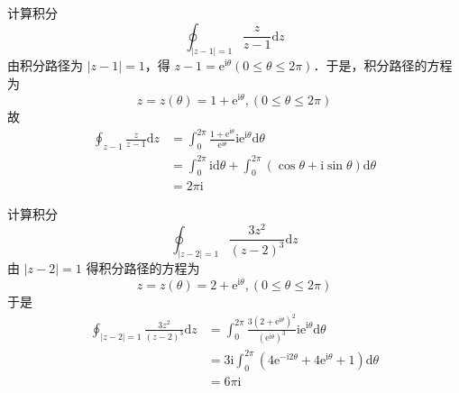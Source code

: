 \begin{example}{}
计算积分
\begin{equation}
\oint_{|z-1|=1} \frac{z}{z-1} \mathrm{d} z
\end{equation}
由积分路径为 $|z -1|=1$，得 $z-1=\mathrm{e}^{\mathrm{i} \theta}(0 \leqslant \theta \leqslant 2 \pi)$．于是，积分路径的方程为
\begin{equation}
z=z(\theta)=1+\mathrm{e}^{\mathrm{i} \theta},(0 \leqslant \theta \leqslant 2 \pi)
\end{equation}
故
\begin{equation}
\begin{aligned} \oint_{z-1} \frac{z}{z-1} \mathrm{d} z &=\int_{0}^{2 \pi} \frac{1+\mathrm{e}^{\mathrm{i} \theta}}{\mathrm{e}^{\mathrm{i} \theta}} \mathrm{ie}^{\mathrm{i} \theta} \mathrm{d} \theta \\ &=\int_{0}^{2 \pi} \mathrm{id} \theta+\int_{0}^{2 \pi}(\cos \theta+\mathrm{i} \sin \theta) \mathrm{d} \theta \\ &=2 \pi \mathrm{i} \end{aligned}
\end{equation}
\end{example}

\begin{example}{}
计算积分
\begin{equation}
\oint_{|z-2|=1} \frac{3 z^{2}}{(z-2)^{3}} \mathrm{d} z
\end{equation}
由 $ |z - 2| =1$ 得积分路径的方程为
\begin{equation}
z=z(\theta)=2+\mathrm{e}^{\mathrm{i} \theta},(0 \leqslant \theta \leqslant 2 \pi)
\end{equation}
于是
\begin{equation}
\begin{aligned} \oint_{|z-2|=1} \frac{3 z^{2}}{(z-2)^{3}} \mathrm{d} z &=\int_{0}^{2 \pi} \frac{3\left(2+\mathrm{e}^{\mathrm{i} \theta}\right)^{2}}{\left(\mathrm{e}^{\mathrm{i} \theta}\right)^{3}} \mathrm{ie}^{\mathrm{i} \theta} \mathrm{d} \theta \\ &=3 \mathrm{i} \int_{0}^{2 \pi}\left(4 \mathrm{e}^{-\mathrm{i} 2 \theta}+4 \mathrm{e}^{\mathrm{i} \theta}+1\right) \mathrm{d} \theta \\ &=6 \pi \mathrm{i} \end{aligned}
\end{equation}
\end{example}